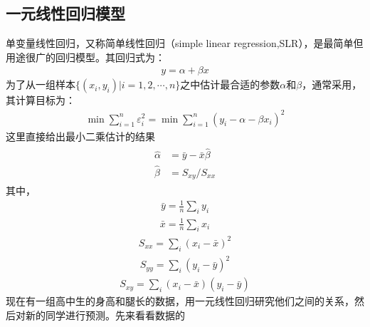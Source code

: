 \documentclass[letterpaper,10pt,english]{sphinxmanual}
\begin{document}
\subsection{一元线性回归模型}
\label{\detokenize{docs/prediction_model:id5}}
单变量线性回归，又称简单线性回归（simple linear regression,SLR），是最简单但用途很广的回归模型。其回归式为：
\begin{equation*}
\begin{split}
y=\alpha+\beta x
\end{split}
\end{equation*}
为了从一组样本\(\{\left(x_{i}, y_{i}\right)|i = 1,2,\cdots,n\}\)之中估计最合适的参数\(\alpha\)和\(\beta\)，通常采用，其计算目标为：
\begin{equation*}
\begin{split}
\min \sum_{i=1}^{n} \varepsilon_{i}^{2}=\min \sum_{i=1}^{n}\left(y_{i}-\alpha-\beta x_{i}\right)^{2}
\end{split}
\end{equation*}
 这里直接给出最小二乘估计的结果
\begin{equation*}
\begin{split}
\begin{aligned}
\hat{\alpha}&=\bar{y}-\bar{x} \hat{\beta}\\
\hat{\beta}&=S_{x y} / S_{x x}
\end{aligned}
\end{split}
\end{equation*}
其中，
\begin{equation*}
\begin{split}
\bar{y}=\frac{1}{n} \sum_{i} y_{i}
\end{split}
\end{equation*}\begin{equation*}
\begin{split}
\bar{x}=\frac{1}{n} \sum_{i} x_{i}
\end{split}
\end{equation*}\begin{equation*}
\begin{split}
S_{x x}=\sum_{i}\left(x_{i}-\bar{x}\right)^{2}
\end{split}
\end{equation*}\begin{equation*}
\begin{split}
S_{y y}=\sum_{i}\left(y_{i}-\bar{y}\right)^{2}
\end{split}
\end{equation*}\begin{equation*}
\begin{split}
S_{x y}=\sum_{i}\left(x_{i}-\bar{x}\right)\left(y_{i}-\bar{y}\right)
\end{split}
\end{equation*}
现在有一组高中生的身高和腿长的数据，用一元线性回归研究他们之间的关系，然后对新的同学进行预测。先来看看数据的
\end{document}
